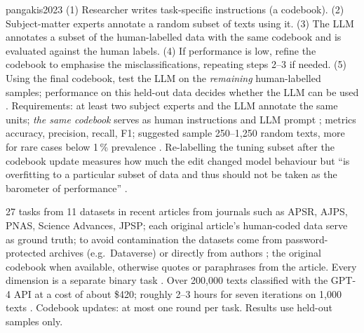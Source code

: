 \begin{papercard}{pangakis2023}
 (1) Researcher writes task-specific instructions (a codebook). (2) Subject-matter experts annotate a random subset of texts using it. (3) The LLM annotates a subset of the human-labelled data with the same codebook and is evaluated against the human labels. (4) If performance is low, refine the codebook to emphasise the misclassifications, repeating steps 2--3 if needed. (5) Using the final codebook, test the LLM on the \emph{remaining} human-labelled samples; performance on this held-out data decides whether the LLM can be used . Requirements: at least two subject experts and the LLM annotate the same units; \emph{the same codebook} serves as human instructions and LLM prompt ; metrics accuracy, precision, recall, F1; suggested sample 250--1,250 random texts, more for rare cases below 1\,\% prevalence . Re-labelling the tuning subset after the codebook update measures how much the edit changed model behaviour but ``is overfitting to a particular subset of data and thus should not be taken as the barometer of performance'' .

 27 tasks from 11 datasets in recent articles from journals such as APSR, AJPS, PNAS, Science Advances, JPSP; each original article's human-coded data serve as ground truth; to avoid contamination the datasets come from password-protected archives (e.g.\ Dataverse) or directly from authors ; the original codebook when available, otherwise quotes or paraphrases from the article. Every dimension is a separate binary task . Over 200,000 texts classified with the GPT-4 API at a cost of about \$420; roughly 2--3 hours for seven iterations on 1,000 texts . Codebook updates: at most one round per task. Results use held-out samples only.


\end{papercard}
